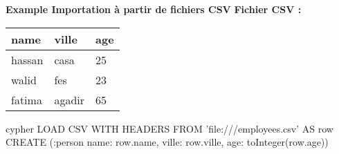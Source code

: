 \begin{frame}{ \textbf{Example  Importation à partir de fichiers CSV}}
\textit{}{\textbf{Fichier CSV :}}  
    \begin{center}
        \begin{tabular}{|l|l|l|}
            \hline
           name & ville& age \\
            \hline
            hassan & casa& 25 \\
           walid & fes  & 23 \\
           fatima & agadir & 65 \\
            \hline
        \end{tabular}
    \end{center}
    
 \begin{block}{cypher}
 LOAD CSV WITH HEADERS FROM 'file:///employees.csv' AS row
CREATE (:person { name: row.name, ville: row.ville, age: toInteger(row.age)})

  \end{block}
\end{frame}    